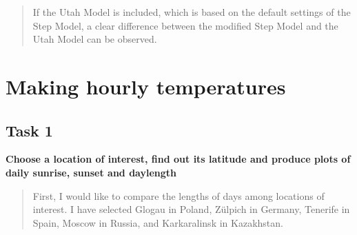 \documentclass[
]{book}
\begin{document}
\begin{quote}
If the Utah Model is included, which is based on the default settings of the Step Model, a clear difference between the modified Step Model and the Utah Model can be observed.
\end{quote}

\hypertarget{making-hourly-temperatures}{%
\chapter{Making hourly temperatures}\label{making-hourly-temperatures}}

\hypertarget{task-1-4}{%
\section{Task 1}\label{task-1-4}}

\textbf{Choose a location of interest, find out its latitude and produce plots of daily sunrise, sunset and daylength}

\begin{quote}
First, I would like to compare the lengths of days among locations of interest. I have selected Glogau in Poland, Zülpich in Germany, Tenerife in Spain, Moscow in Russia, and Karkaralinsk in Kazakhstan.
\end{quote}
\end{document}
